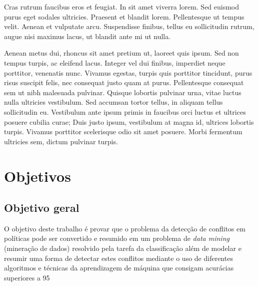 Cras rutrum faucibus eros et feugiat. In sit amet viverra lorem. Sed euismod purus eget sodales ultricies. Praesent et blandit lorem. Pellentesque ut tempus velit. Aenean et vulputate arcu. Suspendisse finibus, tellus eu sollicitudin rutrum, augue nisi maximus lacus, ut blandit ante mi ut nulla.

Aenean metus dui, rhoncus sit amet pretium ut, laoreet quis ipsum. Sed non tempus turpis, ac eleifend lacus. Integer vel dui finibus, imperdiet neque porttitor, venenatis nunc. Vivamus egestas, turpis quis porttitor tincidunt, purus risus suscipit felis, nec consequat justo quam at purus. Pellentesque consequat sem ut nibh malesuada pulvinar. Quisque lobortis pulvinar urna, vitae luctus nulla ultricies vestibulum. Sed accumsan tortor tellus, in aliquam tellus sollicitudin eu. Vestibulum ante ipsum primis in faucibus orci luctus et ultrices posuere cubilia curae; Duis justo ipsum, vestibulum at magna id, ultrices lobortis turpis. Vivamus porttitor scelerisque odio sit amet posuere. Morbi fermentum ultricies sem, dictum pulvinar turpis. 

\section{Objetivos}\label{objetivos}
\subsection{Objetivo geral}\label{objetivo_geral}
O objetivo deste trabalho é provar que o problema da detecção de conflitos em políticas pode ser convertido e resumido em um problema de \textit{data mining} (mineração de dados) resolvido pela tarefa da classificação além de modelar e resumir uma forma de detectar estes conflitos mediante o uso de diferentes algoritmos e técnicas da aprendizagem de máquina que consigam acurácias superiores a 95%

